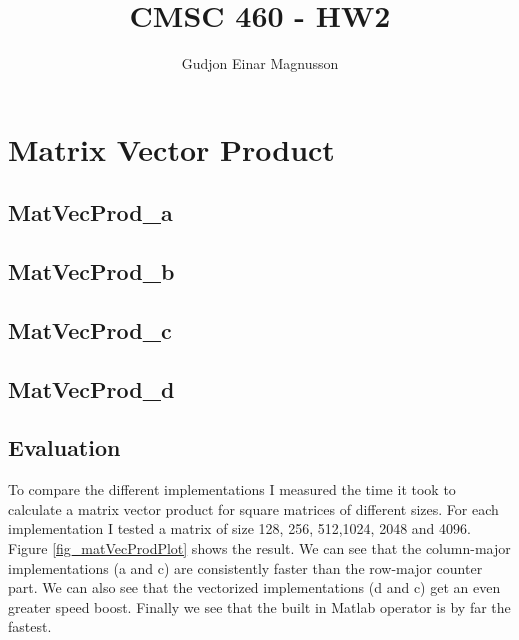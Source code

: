 \documentclass[12pt]{article}
\begin{document}
\title{CMSC 460 - HW2}
\author{Gudjon Einar Magnusson}

\maketitle

\section{Matrix Vector Product}

\subsection{MatVecProd\_a}
\begin{minipage}{\linewidth}

\end{minipage}


\subsection{MatVecProd\_b}
\begin{minipage}{\linewidth}

\end{minipage}

\subsection{MatVecProd\_c}
\begin{minipage}{\linewidth}

\end{minipage}

\subsection{MatVecProd\_d}
\begin{minipage}{\linewidth}

\end{minipage}

\subsection{Evaluation}

To compare the different implementations I measured the time it took to calculate a matrix vector product for square matrices of different sizes. For each implementation I tested a matrix of size 128, 256, 512,1024, 2048 and 4096. Figure \ref{fig_matVecProdPlot} shows the result. We can see that the column-major implementations (a and c) are consistently faster than the row-major counter part. We can also see that the vectorized implementations (d and c) get an even greater speed boost. Finally we see that the built in Matlab operator is by far the fastest.
\end{document}

